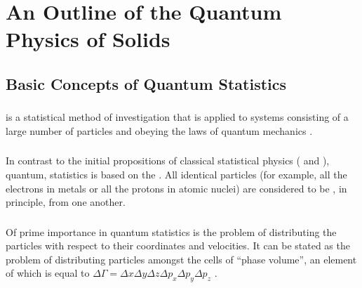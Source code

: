 



\chapter[Quantum Physics Of Solids]{An Outline of the Quantum Physics of Solids}
\label{ch-41}

\section{Basic Concepts of Quantum Statistics}
\label{sec-41.1} 

\subsection{}\label{41.1.1}  is a statistical method of investigation  that is applied to systems consisting of a large number of particles and obeying the laws of quantum mechanics .

\subsection{}\label{41.1.2} In contrast to the initial propositions of classical statistical physics ( and ), quantum, statistics is based on the . All identical particles (for example, all the electrons in metals or all the protons in atomic nuclei) are considered to be , in principle, from one another.

\subsection{}\label{41.1.3} Of prime importance in quantum statistics is the problem of distributing the particles with respect to their coordinates and velocities. It can be stated as the problem of distributing particles amongst the cells of ``phase volume'', an element of which is equal to $\Delta \Gamma = \Delta x \Delta y \Delta z \Delta p_{x} \Delta p_{y} \Delta p_{z}$ . 

